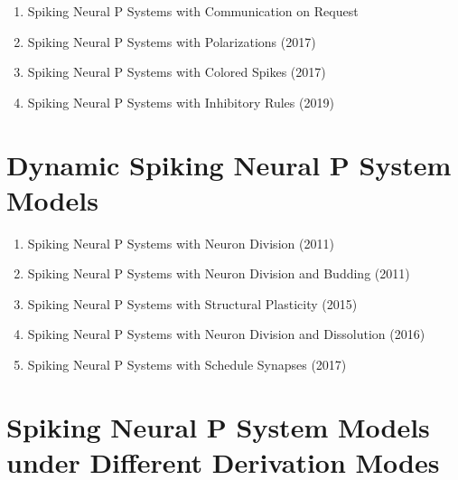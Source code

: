 \documentclass[a4paper]{article}
\begin{document}
\begin{enumerate}
\item Spiking Neural P Systems with Communication on Request
\cite{pan-2017-communication-on-request}

\item Spiking Neural P Systems with Polarizations (2017)
\cite{wu-2018-polarizations}

\item Spiking Neural P Systems with Colored Spikes (2017)
\cite{song-2018-colored-spikes}

\item Spiking Neural P Systems with Inhibitory Rules (2019)
\cite{peng-2019-inhibitory-rules}

\end{enumerate}


\section{Dynamic Spiking Neural P System Models}

\begin{enumerate}

\item Spiking Neural P Systems with Neuron Division (2011)
\cite{wang-2011-neuron-division}

\item Spiking Neural P Systems with Neuron Division and Budding (2011)
\cite{pan-2011-division-budding}

\item Spiking Neural P Systems with Structural Plasticity (2015)
\cite{cabarle-2015-structural-plasticity}

\item Spiking Neural P Systems with Neuron Division and Dissolution (2016)
\cite{zhao-2016-division-dissolution}

\item Spiking Neural P Systems with Schedule Synapses (2017)
\cite{cabarle-2017-scheduled-synapses}

\end{enumerate}


\section{Spiking Neural P System Models under Different Derivation Modes}
\end{document}

